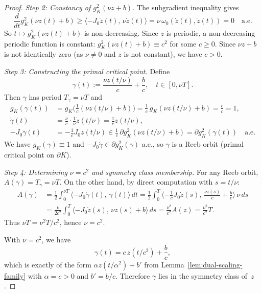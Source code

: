 \begin{proof}
\emph{Step 2: Constancy of $g_K^2(\nu z + b)$.}
The subgradient inequality gives
\[
  \frac{d}{dt} g_K^2(\nu z(t) + b)
  \geq \langle -J_0\dot{z}(t),\, \nu\dot{z}(t) \rangle
  = \nu\, \omega_0(\dot{z}(t), \dot{z}(t)) = 0
  \quad\text{a.e.}
\]
So $t \mapsto g_K^2(\nu z(t) + b)$ is non-decreasing.
Since $z$ is periodic, a non-decreasing periodic function is constant:
$g_K^2(\nu z(t) + b) \equiv c^2$ for some $c \geq 0$.
Since $\nu z + b$ is not identically zero (as $\nu \neq 0$ and $z$ is not constant),
we have $c > 0$.

\emph{Step 3: Constructing the primal critical point.}
Define
\[
  \gamma(t) := \frac{\nu z(t/\nu)}{c} + \frac{b}{c},
  \quad t \in [0, \nu T].
\]
Then $\gamma$ has period $T_\gamma = \nu T$ and
\begin{align*}
  g_K(\gamma(t))
  &= g_K\bigl(\tfrac{1}{c}(\nu z(t/\nu) + b)\bigr)
   = \tfrac{1}{c}\, g_K(\nu z(t/\nu) + b) = \tfrac{c}{c} = 1, \\
  \dot{\gamma}(t)
  &= \tfrac{\nu}{c} \cdot \tfrac{1}{\nu} \dot{z}(t/\nu)
   = \tfrac{1}{c}\dot{z}(t/\nu), \\
  -J_0\dot{\gamma}(t)
  &= -\tfrac{1}{c} J_0\dot{z}(t/\nu)
   \in \tfrac{1}{c}\, \partial g_K^2(\nu z(t/\nu) + b)
   = \partial g_K^2(\gamma(t))
  \quad\text{a.e.}
\end{align*}
We have $g_K(\gamma) \equiv 1$ and $-J_0\dot{\gamma} \in \partial g_K^2(\gamma)$ a.e.,
so $\gamma$ is a Reeb orbit (primal critical point on $\partial K$).

\emph{Step 4: Determining $\nu = c^2$ and symmetry class membership.}
For any Reeb orbit, $A(\gamma) = T_\gamma = \nu T$.
On the other hand, by direct computation with $s = t/\nu$:
\begin{align*}
  A(\gamma)
  &= \tfrac{1}{2}\!\int_0^{\nu T} \langle -J_0\dot{\gamma}(t),\, \gamma(t) \rangle\, dt
   = \tfrac{1}{2}\!\int_0^{T} \langle -\tfrac{1}{c} J_0\dot{z}(s),\,
     \tfrac{\nu z(s)}{c} + \tfrac{b}{c} \rangle\, \nu\, ds \\
  &= \tfrac{\nu}{2c^2}\!\int_0^{T} \langle -J_0\dot{z}(s),\, \nu z(s) + b \rangle\, ds
   = \tfrac{\nu^2}{c^2} A(z)
   = \tfrac{\nu^2}{c^2} T.
\end{align*}
Thus $\nu T = \nu^2 T / c^2$, hence $\nu = c^2$.

With $\nu = c^2$, we have
\[
  \gamma(t) = c\, z(t/c^2) + \frac{b}{c},
\]
which is exactly of the form $\alpha z(t/\alpha^2) + b'$ from
Lemma~\ref{lem:dual-scaling-family} with $\alpha = c > 0$ and $b' = b/c$.
Therefore $\gamma$ lies in the symmetry class of~$z$.


\end{proof}
